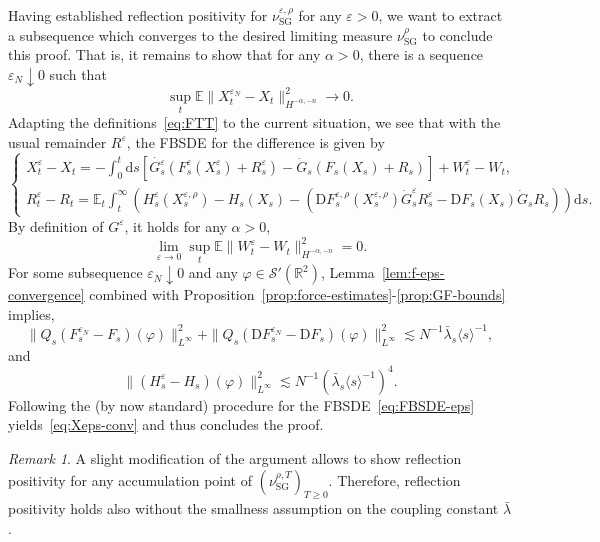 \documentclass[11pt, a4paper]{scrartcl}
\numberwithin{equation}{section}
\theoremstyle{plain}
\theoremstyle{remark}
\newtheorem{remark}[foo]{Remark}
\newcommand{\mathD}{\mathrm{D}}
\newcommand{\mathd}{\mathrm{d}}
\newcommand{\tmop}[1]{\ensuremath{\operatorname{#1}}}
\begin{document}
Having established reflection positivity for $\nu_{\tmop{SG}}^{\varepsilon,
		\rho}$ for any $\varepsilon > 0$, we want to extract a subsequence which
converges to the desired limiting measure $\nu_{\tmop{SG}}^{\rho}$ to conclude
this proof. That is, it remains to show that for any $\alpha > 0$, there is a
sequence $\varepsilon_N \downarrow 0$ such that
\begin{equation}
	\sup_t \mathbb{E} \| X_t^{\varepsilon_N} - X_t \|^2_{H^{- \alpha, - n}}
	\rightarrow 0. \label{eq:Xeps-conv}
\end{equation}
Adapting the definitions~\eqref{eq:FTT} to the current situation, we see that
with the usual remainder $R^{\varepsilon}$, the FBSDE for the difference is
given by
\begin{equation}
	\begin{cases}
		X_t^{\varepsilon} - X_t = - \int_0^t \mathd s [\dot{G_s^{\varepsilon}}
		(F_s^{\varepsilon} (X_s^{\varepsilon}) + R_s^{\varepsilon}) - \dot{G}_s
		(F_s (X_s) + R_s)] + W^{\varepsilon}_t - W_t, \\
		R_t^{\varepsilon} - R_t = \mathbb{E}_t\int_t^{\infty}
		(H^{\varepsilon}_s (X^{\varepsilon, \rho}_s) - H_s (X_s)-(\mathD F_s^{\varepsilon, \rho}
		(X^{\varepsilon, \rho}_s)  \dot{G}^{\varepsilon}_s R^{\varepsilon}_s - \mathD
		F_s (X_s)  \dot{G}_s R_s))\mathd s.
	\end{cases} \label{eq:FBSDE-eps}
\end{equation}
By definition of $G^{\varepsilon}$, it holds for any $\alpha > 0$,
\[ \lim_{\varepsilon \rightarrow 0} \sup_t \mathbb{E} \| W^{\varepsilon}_t -
	W_t \|_{H^{- \alpha, - n}}^2 = 0. \]
For some subsequence $\varepsilon_N \downarrow 0$ and any $\varphi \in
	\mathcal{S}' (\mathbb{R}^2)$, Lemma~\ref{lem:f-eps-convergence} combined with
Proposition~\ref{prop:force-estimates}-\ref{prop:GF-bounds} implies,
\[ \| Q_s (F_s^{\varepsilon_N} - F_s) (\varphi) \|_{L^{\infty}}^2 + \| Q_s
	(\mathD F_s^{\varepsilon_N} - \mathD F_s) (\varphi) \|_{L^{\infty}}^2
	\lesssim N^{- 1} \bar{\lambda}_s \langle s \rangle^{- 1}, \]
and
\[ \| (H^{\varepsilon}_s - H_s) (\varphi) \|_{L^{\infty}}^2 \lesssim N^{- 1}
	(\bar{\lambda}_s \langle s \rangle^{- 1})^4 . \]
Following the (by now standard) procedure for the FBSDE~\eqref{eq:FBSDE-eps}
yields~\eqref{eq:Xeps-conv} and thus concludes the proof.

\begin{remark}
	A slight modification of the argument allows to show reflection positivity
	for any accumulation point of $(\nu_{\tmop{SG}}^{\rho, T})_{T \geqslant 0}$.
	Therefore, reflection positivity holds also without the smallness assumption
	on the coupling constant $\bar{\lambda}$.
\end{remark}
\end{document}
